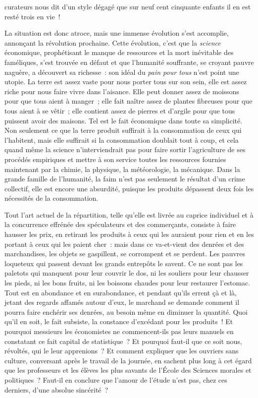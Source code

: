 \documentclass[french,twoside]{book} %
\begin{document}
curateurs nous dit d’un style dégagé que sur neuf  cent cinquante enfants il en est resté trois en vie !\par
La situation est donc atroce, mais une immense évolution s’est accomplie, annonçant la révolution prochaine. Cette évolution, c’est que la \emph{science} économique, prophétisant le manque de ressources et la mort inévitable des faméliques, s’est trouvée en défaut et que l’humanité souffrante, se croyant pauvre naguère, a découvert sa richesse : son idéal du \emph{pain pour tous} n’est point une utopie. La terre est assez vaste pour nous porter tous sur son sein, elle est assez riche pour nous faire vivre dans l’aisance. Elle peut donner assez de moissons pour que tous aient à manger ; elle fait naître assez de plantes fibreuses pour que tous aient à se vêtir ; elle contient  assez de pierres et d’argile pour que tous puissent avoir des maisons. Tel est le fait économique dans toute sa simplicité. Non seulement ce que la terre produit suffirait à la consommation de ceux qui l’habitent, mais elle suffirait si la consommation doublait tout à coup, et cela quand même la science n’interviendrait pas pour faire sortir l’agriculture de ses procédés empiriques et mettre à son service toutes les ressources fournies maintenant par la chimie, la physique, la météorologie, la mécanique. Dans la grande famille de l’humanité, la faim n’est pas seulement le résultat d’un crime collectif, elle est encore une absurdité, puisque les produits dépassent deux fois les nécessités de la consommation.\par
 Tout l’art actuel de la répartition, telle qu’elle est livrée au caprice individuel et à la concurrence effrénée des spéculateurs et des commerçants, consiste à faire hausser les prix, en retirant les produits à ceux qui les auraient pour rien et en les portant à ceux qui les paient cher : mais dans ce va-et-vient des denrées et des marchandises, les objets se gaspillent, se corrompent et se perdent. Les pauvres loqueteux qui passent devant les grands entrepôts le savent. Ce ne sont pas les paletots qui manquent pour leur couvrir le dos, ni les souliers pour leur chausser les pieds, ni les bons fruits, ni les boissons chaudes pour leur restaurer l’estomac. Tout est en abondance et en surabondance, et pendant qu’ils errent çà et là, jetant  des regards affamés autour d’eux, le marchand se demande comment il pourra faire enchérir ses denrées, au besoin même en diminuer la quantité. Quoi qu’il en soit, le fait subsiste, la constance d’excédant pour les produits ! Et pourquoi messieurs les économistes ne commencent-ils pas leurs manuels en constatant ce fait capital de statistique ? Et pourquoi faut-il que ce soit nous, révoltés, qui le leur apprenions ? Et comment expliquer que les ouvriers sans culture, conversant après le travail de la journée, en sachent plus long à cet égard que les professeurs et les élèves les plus savants de l’École des Sciences morales et politiques ? Faut-il en conclure que l’amour de l’étude n’est pas, chez ces derniers, d’une absolue sincérité ?\par
\end{document}
